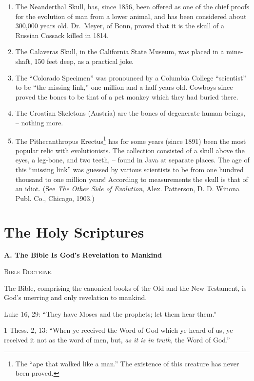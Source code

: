\documentclass[
]{book}
\begin{document}
\begin{enumerate}
\def\labelenumi{\arabic{enumi}.}
\item
  The Neanderthal Skull, has, since 1856, been offered as one of the chief proofs for the evolution of man from a lower animal, and has been considered about 300,000 years old. Dr.~Meyer, of Bonn, proved that it is the skull of a Russian Cossack killed in 1814.
\item
  The Calaveras Skull, in the California State Museum, was placed in a mine-shaft, 150 feet deep, as a practical joke.
\item
  The ``Colorado Specimen'' was pronounced by a Columbia College ``scientist'' to be ``the missing link,'' one million and a half years old. Cowboys since proved the bones to be that of a pet monkey which they had buried there.
\item
  The Croatian Skeletons (Austria) are the bones of degenerate human beings, -- nothing more.
\item
  The Pithecanthropus Erectus\footnote{The ``ape that walked like a man.'' The existence of this creature has never been proved.} has for some years (since 1891) been the most popular relic with evolutionists. The collection consisted of a skull above the eyes, a leg-bone, and two teeth, -- found in Java at separate places. The age of this ``missing link'' was guessed by various scientists to be from one hundred thousand to one million years! According to measurements the skull is that of an idiot. (See \emph{The Other Side of Evolution}, Alex. Patterson, D. D. Winona Publ. Co., Chicago, 1903.)
\end{enumerate}

\section{The Holy Scriptures}\label{the-holy-scriptures}

\begin{center}
\textbf{A.  The Bible Is God's Revelation to Mankind}

\textsc{Bible Doctrine.}
\end{center}

The Bible, comprising the canonical books of the Old and the New Testament, is God's unerring and only revelation to mankind.

Luke 16, 29: ``They have Moses and the prophets; let them hear them.''

1 Thess. 2, 13: ``When ye received the Word of God which ye heard of us, ye received it not as the word of men, but, \emph{as it is in truth}, the Word of God.''
\end{document}
